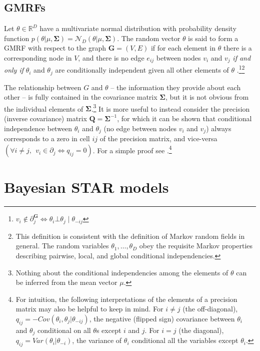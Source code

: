 \subsection{GMRFs}
Let $\theta \in \mathbb{R}^D$ have a multivariate normal distribution with probability density function $p(\theta | \mu, \boldsymbol{\Sigma}) = \mathcal{N}_D (\theta | \mu, \boldsymbol{\Sigma})$. The random vector $\theta$ is said to form a GMRF with respect to the graph $\mathbf{G} = (V,E)$ if for each element in $\theta$ there is a corresponding node in $V$, and there is no edge $e_{ij}$ between nodes $v_i$ and $v_j$ \emph{if and only if} $\theta_i$ and $\theta_j$ are conditionally independent given all other elements of $\theta$ .\footnote{$v_i \notin \partial^\mathbf{G}_{j} \iff \theta_i \bot \theta_j \mid \theta_{-ij}$}\footnote{This definition is consistent with the definition of Markov random fields in general. The random variables $\theta_1, \dots, \theta_D$ obey the requisite Markov properties describing pairwise, local, and global conditional independencies.} 

The relationship between $G$ and $\theta$ -- the information they provide about each other -- is fully contained in the covariance matrix $\boldsymbol{\Sigma}$, but it is not obvious from the individual elements of $\boldsymbol{\Sigma}$.\footnote{Nothing about the conditional independencies among the elements of $\theta$ can be inferred from the mean vector $\mu$.} It is more useful to instead consider the precision (inverse covariance) matrix $\mathbf{Q}=\boldsymbol{\Sigma}^{-1}$, for which it can be shown that conditional independence between $\theta_i$ and $\theta_j$ (no edge between nodes $v_i$ and $v_j$) always corresponds to a zero in cell $ij$ of the precision matrix, and vice-versa $(\forall i \neq j, \:\: v_i \in \partial_j \iff q_{ij} = 0)$.  For a simple proof see .\footnote{For intuition, the following interpretations of the elements of a precision matrix may also be helpful to keep in mind. For $i \neq j$ (the off-diagonal), $q_{ij}  = -Cov(\theta_i, \theta_j | \theta_{-ij}) $, the negative (flipped sign) covariance between $\theta_i$ and $\theta_j$ conditional on all $\theta$s except $i$ and $j$.  For $i = j$ (the diagonal),  $q_{ij} = Var(\theta_i | \theta_{-i})$, the variance of $\theta_i$ conditional all the variables except $\theta_i$.}






\section{Bayesian STAR models}
\label{star}

